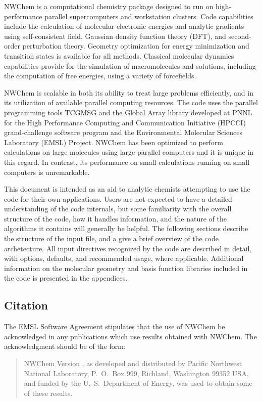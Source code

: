 \label{sec:intro}

NWChem is a computational chemistry package designed to run on
high-performance parallel supercomputers and workstation clusters.
Code capabilities include the calculation of molecular electronic
energies and analytic gradients using self-consistent field, Gaussian
density function theory (DFT), and second-order perturbation theory.
Geometry optimization for energy minimization and transition states is
available for all methods.  Classical molecular dynamics capabilities
provide for the simulation of macromolecules and solutions, including
the computation of free energies, using a variety of forcefields.

NWChem is scalable in both its ability to treat large problems
efficiently, and in its utilization of available parallel computing
resources.  The code uses the parallel programming tools TCGMSG and
the Global Array library developed at PNNL for the High Performance
Computing and Communication Initiative (HPCCI) grand-challenge
software program and the Environmental Molecular Sciences Laboratory
(EMSL) Project.  NWChem has been optimized to perform calculations on
large molecules using large parallel computers and it is unique in
this regard.  In contrast, its performance on small calculations
running on small computers is unremarkable.

This document is intended as an aid to analytic chemists attempting to
use the code for their own applications.  Users are not expected to
have a detailed understanding of the code internals, but some
familiarity with the overall structure of the code, how it handles
information, and the nature of the algorithms it contains will
generally be helpful.  The following sections describe the structure
of the input file, and a give a brief overview of the code
archetecture.  All input directives recognized by the code are
described in detail, with options, defaults, and recommended usage,
where applicable.  Additional information on the molecular geometry
and basis function libraries included in the code is presented in the
appendices.

\subsection{Citation}

The EMSL Software Agreement stipulates that the use of NWChem be
acknowledged in any publications which use results obtained with
NWChem.  The acknowledgment should be of the form:
\begin{quote}

  NWChem Version \nwchemversion, as developed and distributed by
  Pacific Northwest National Laboratory, P.~O.~Box 999, Richland,
  Washington 99352 USA, and funded by the U.~S.~Department of Energy,
  was used to obtain some of these results.
\end{quote}

